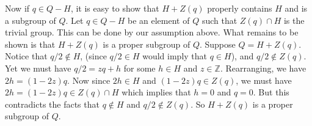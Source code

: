 \documentclass[12pt]{article}
\newcommand{\Z}{\mathbb{Z}}
\begin{document}
Now if $q\in Q-H$, it is easy to show that $H+Z(q)$
properly contains $H$ and is a subgroup of $Q$.
Let $q\in Q-H$ be an element of $Q$ such that $Z(q)\cap H$
is the trivial group.  This can be done by our assumption above.
What remains to be shown is that $H+Z(q)$ is a proper
subgroup of $Q$.  Suppose $Q=H+Z(q)$.
Notice that $q/2\not\in H$, (since $q/2\in H$ would imply that $q\in H$), and $q/2\not\in Z(q)$.
Yet we must have $q/2=zq+h$ for some $h\in H$ and $z\in\Z$.
Rearranging, we have $2h=(1-2z)q$.  Now since $2h\in H$
and $(1-2z)q\in Z(q)$, we must have $2h=(1-2z)q\in Z(q)\cap H$ which
implies that $h=0$ and $q=0$.  But this contradicts the facts that
$q\not\in H$ and $q/2\not\in Z(q)$.  So $H+Z(q)$ is a proper subgroup of $Q$.
\end{document}
